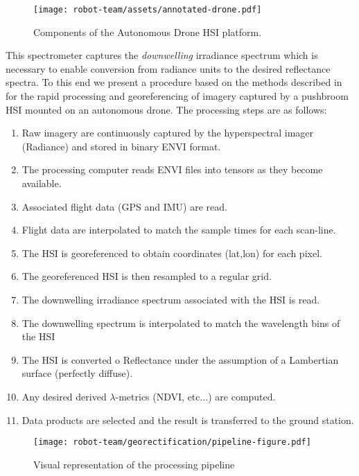 \begin{figure}[!hbt]
  \centering
  \texttt{[image: robot-team/assets/annotated-drone.pdf]}
  \caption{Components of the Autonomous Drone HSI platform.}
  \label{fig:drone-components}
\end{figure}
This spectrometer captures the \textit{downwelling} irradiance spectrum which is necessary to enable conversion from radiance units to the desired reflectance spectra. To this end we present a procedure based on the methods described in \cite{muller-georeferencing, GeorectivicationBaumker, GeorectificationMostafa} for the rapid processing and georeferencing of imagery captured by a pushbroom HSI mounted on an autonomous drone. The processing steps are as follows:
\begin{enumerate}
\item Raw imagery are continuously captured by the hyperspectral imager (Radiance) and stored in binary ENVI format.
\item The processing computer reads ENVI files into tensors as they become available.
\item Associated flight data (GPS and IMU) are read.
\item Flight data are interpolated to match the sample times for each scan-line.
\item The HSI is georeferenced to obtain coordinates (lat,lon) for each pixel.
\item The georeferenced HSI is then resampled to a regular grid.
\item The downwelling irradiance spectrum associated with the HSI is read.
\item The downwelling spectrum is interpolated to match the wavelength bins of the HSI
\item The HSI is converted o Reflectance under the assumption of a Lambertian surface (perfectly diffuse).
\item Any desired derived $\lambda$-metrics (NDVI, etc...) are computed.
\item Data products are selected and the result is transferred to the ground station.
\end{enumerate}

\begin{figure}[h]
  \centering
  \texttt{[image: robot-team/georectification/pipeline-figure.pdf]}
  \caption{Visual representation of the processing pipeline}
  \label{fig:annotated-hsi}
\end{figure}


